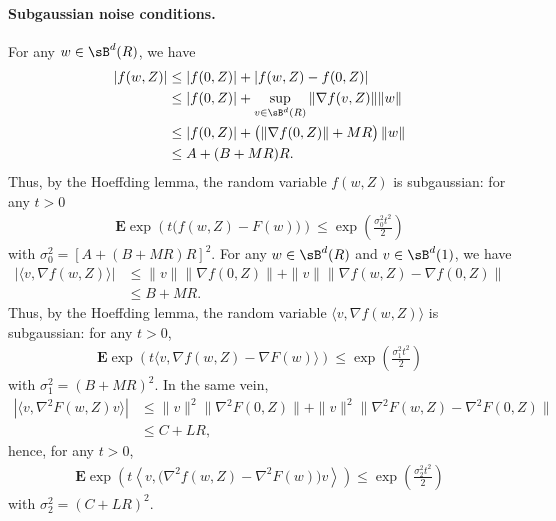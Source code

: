 \documentclass[final,12pt]{colt2018}
\numberwithin{equation}{section}
\numberwithin{equation}{section}
\def\E{\mathbf{E}}
\def\ave#1{\langle #1 \rangle}
\begin{document}
	\paragraph{Subgaussian noise conditions.} For any $w \in \sB^d(R)$, we have
   \begin{align*}
	   |f(w,Z)| &\le |f(0,Z)| + |f(w,Z)-f(0,Z)| \\
	   &\le |f(0,Z)| + \sup_{v \in \sB^d(R)}\|\nabla f(v,Z)\| \|w\| \\
	   &\le |f(0,Z)| + \left(\|\nabla f(0,Z)\| + MR\right)\|w\| \\
	   &\le A + (B+MR)R.
	\end{align*}
	Thus, by the Hoeffding lemma, the random variable $f(w,Z)$ is subgaussian: for any $t > 0$
		\begin{align}\label{eq:0th_order_noise}
			\E \exp\left( t \Big(f(w, Z) - F(w)\Big)\right) \leq \exp\left( \frac{\sigma_0^2 t^2}{2} \right)
		\end{align}
	with $\sigma^2_0 = [A+(B+MR)R]^2$. For any $w \in \sB^d(R)$ and $v \in \sB^d(1)$, we have
	\begin{align*}
		|\langle{v, \nabla f(w,Z)\rangle}| &\le \|v\| \|\nabla f(0,Z)\| + \|v\| \|\nabla f(w,Z)-\nabla f(0,Z)\| \\
		&\le B + MR.
	\end{align*}
	Thus, by the Hoeffding lemma, the random variable $\ave{v,\nabla f(w,Z)}$ is subgaussian: for any $t > 0$,
		\begin{align}\label{eq:1st_order_noise}
			\E \exp\left( t \langle v, \nabla f(w, Z) - \nabla F(w) \rangle  \right) \leq \exp\left( \frac{\sigma_1^2 t^2}{2} \right)
		\end{align}
with $\sigma_1^2 = (B + MR)^2$. In the same vein,
	\begin{align*}
		|\ave{v, \nabla^2 F(w,Z)v}| &\le \|v\|^2 \|\nabla^2 F(0,Z)\| + \|v\|^2 \|\nabla^2 F(w,Z)-\nabla^2 F(0,Z)\| \\
		&\le C + LR,
	\end{align*}
hence, for any $t > 0$,
	\begin{align}\label{eq:2nd_order_noise}
	\E \exp\left( t \left\langle v,\big(\nabla^2 f(w, Z) - \nabla^2 F(w)\big)v \right\rangle  \right) \leq \exp\left( \frac{\sigma_2^2 t^2}{2} \right)
	\end{align}
with $ \sigma_2^2 = (C + LR)^2$.
\end{document}
